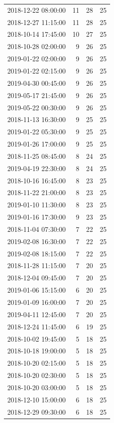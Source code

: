 \begin{tabular}{lrrr}
2018-12-22 08:00:00 & 11 & 28 & 25 \\
2018-12-27 11:15:00 & 11 & 28 & 25 \\
2018-10-14 17:45:00 & 10 & 27 & 25 \\
2018-10-28 02:00:00 & 9 & 26 & 25 \\
2019-01-22 02:00:00 & 9 & 26 & 25 \\
2019-01-22 02:15:00 & 9 & 26 & 25 \\
2019-04-30 00:45:00 & 9 & 26 & 25 \\
2019-05-17 21:45:00 & 9 & 26 & 25 \\
2019-05-22 00:30:00 & 9 & 26 & 25 \\
2018-11-13 16:30:00 & 9 & 25 & 25 \\
2019-01-22 05:30:00 & 9 & 25 & 25 \\
2019-01-26 17:00:00 & 9 & 25 & 25 \\
2018-11-25 08:45:00 & 8 & 24 & 25 \\
2019-04-19 22:30:00 & 8 & 24 & 25 \\
2018-10-16 16:45:00 & 8 & 23 & 25 \\
2018-11-22 21:00:00 & 8 & 23 & 25 \\
2019-01-10 11:30:00 & 8 & 23 & 25 \\
2019-01-16 17:30:00 & 9 & 23 & 25 \\
2018-11-04 07:30:00 & 7 & 22 & 25 \\
2019-02-08 16:30:00 & 7 & 22 & 25 \\
2019-02-08 18:15:00 & 7 & 22 & 25 \\
2018-11-28 11:15:00 & 7 & 20 & 25 \\
2018-12-04 09:45:00 & 7 & 20 & 25 \\
2019-01-06 15:15:00 & 6 & 20 & 25 \\
2019-01-09 16:00:00 & 7 & 20 & 25 \\
2019-04-11 12:45:00 & 7 & 20 & 25 \\
2018-12-24 11:45:00 & 6 & 19 & 25 \\
2018-10-02 19:45:00 & 5 & 18 & 25 \\
2018-10-18 19:00:00 & 5 & 18 & 25 \\
2018-10-20 02:15:00 & 5 & 18 & 25 \\
2018-10-20 02:30:00 & 5 & 18 & 25 \\
2018-10-20 03:00:00 & 5 & 18 & 25 \\
2018-12-10 15:00:00 & 6 & 18 & 25 \\
2018-12-29 09:30:00 & 6 & 18 & 25 \\

\end{tabular}
